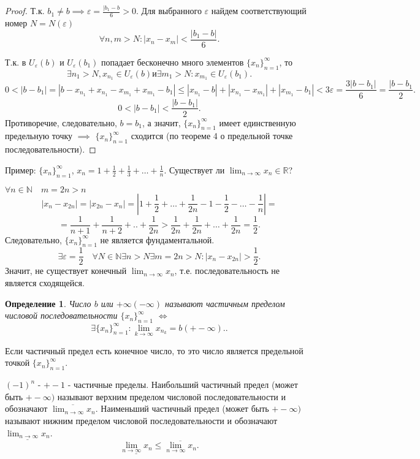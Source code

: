 \documentclass[a4paper,12pt]{article} %
\newtheorem{definition}{Определение}[subsection]
\theoremstyle{remark}
\begin{document}
\begin{proof}
Т.к. $b_1 \neq  b \implies \varepsilon = \frac{|b_1-b}{6} > 0.$ Для выбранного $\varepsilon$ найдем соответствующий номер $N=N(\varepsilon)$
\[
\forall n, m >N : |x_{n} - x_{m}| < \frac{|b_1-b|}{6}
.\] 

Т.к. в $U_\varepsilon(b)$ и $U_\varepsilon(b_1)$ попадает бесконечно много элементов $\{x_n\}_{n=1}^{\infty}$, то
\[
	\exists  n_1>N, x_{n_1} \in  U_\varepsilon(b) \text{и} \exists m_1>N : x_{m_1} \in U_\varepsilon(b_1)
.\] 
\[
	0 < |b-b_1| = |b-x_{n_1} + x_{n_1} - x_{m_1} + x_{m_1} - b_1| \le |x_{n_1} - b| + |x_{n_1} - x_{m_1}| + |x_{m_1} - b_1| <3\varepsilon = \frac{3|b-b_1|}{6} = \frac{|b-b_1}{2}
.\] 
\[
0 < |b-b_1| < \frac{|b-b_1|}{2}
.\] 
Противоречие, следовательно, $b=b_1$, а значит, $\{x_n\}_{n=1}^{\infty}$ имеет единственную предельную точку $\implies$ $\{x_n\}_{n=1}^{\infty}$ сходится (по теореме 4 о предельной точке последовательности).
\end{proof}

Пример: $\{x_n\}_{n=1}^{\infty}$, $x_{n} = 1 + \frac{1}{2} + \frac{1}{3} + \ldots + \frac{1}{n}$. Существует ли $\lim_{n \to \infty} x_n \in  \mathbb{R}$?

$\forall n \in  \mathbb{N} \quad m = 2n > n$
\[
	|x_{n} - x_{2n}| = |x_{2n} - x_{n}| = |1 + \frac{1}{2} + \ldots + \frac{1}{2n} - 1 - \frac{1}{2} -\ldots - \frac{1}{n}| =
\] 
\[
= \frac{1}{n+1} + \frac{1}{n+2} + .. + \frac{1}{2n} > \frac{1}{2n} + \frac{1}{2n} + \ldots + \frac{1}{2n} = \frac{1}{2}
.\] 
Следовательно, $\{x_n\}_{n=1}^{\infty}$ не является фундаментальной.
\[
	\exists \varepsilon=\frac{1}{2} \quad \forall N\in  \mathbb{N} \exists n>N \exists m=2n>N : |x_{n}-x_{2n}| > \frac{1}{2}
.\] 
Значит, не существует конечный $\lim_{n \to \infty} x_n$, т.е. последовательность не является сходящейся.


\begin{definition}
	Число $b$ или $+\infty(-\infty)$ называют частичным пределом числовой последовательности $\{x_n\}_{n=1}^{\infty}$ $\iff$
	\[
		\exists  \{x_n\}_{n=1}^{\infty} : \lim_{k \to \infty} x_{n_k} = b (+-\infty).
	.\] 
\end{definition}
	Если частичный предел есть конечное число, то это число является предельной точкой $\{x_n\}_{n=1}^{\infty}$.

	$(-1)^{n}$ - $+-1$ - частичные пределы.
	Наибольший частичный предел (может быть $+-\infty)$ называют верхним пределом числовой последовательности и обозначают $\overline{\lim_{n \to \infty} x_n}$.
	Наименьший частичный предел (может быть $+-\infty)$ называют нижним пределом числовой последовательности и обозначают $\underline{\lim_{n \to \infty} x_n}$.
	\[
		\underline{\lim_{n \to \infty} x_n} \le \overline{\lim_{n \to \infty} x_n}
	.\] 
\end{document}
